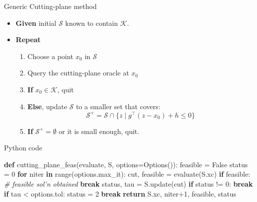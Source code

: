 \documentclass[10pt,ignorenonframetext,serif,onlymath]{beamer}
\newenvironment{Shaded}{}{}
\newcommand{\BuiltInTok}[1]{#1}
\newcommand{\CommentTok}[1]{\textcolor[rgb]{0.38,0.63,0.69}{\textit{#1}}}
\newcommand{\ControlFlowTok}[1]{\textcolor[rgb]{0.00,0.44,0.13}{\textbf{#1}}}
\newcommand{\DecValTok}[1]{\textcolor[rgb]{0.25,0.63,0.44}{#1}}
\newcommand{\KeywordTok}[1]{\textcolor[rgb]{0.00,0.44,0.13}{\textbf{#1}}}
\newcommand{\NormalTok}[1]{#1}
\newcommand{\OperatorTok}[1]{\textcolor[rgb]{0.40,0.40,0.40}{#1}}
\newcommand{\VariableTok}[1]{\textcolor[rgb]{0.10,0.09,0.49}{#1}}
\providecommand{\tightlist}{%
  \setlength{\itemsep}{0pt}\setlength{\parskip}{0pt}}
\begin{document}
\begin{frame}{Generic Cutting-plane method}
\protect\hypertarget{sec:generic-cutting-plane-method}{}

\begin{itemize}
\tightlist
\item
  \textbf{Given} initial \(\mathcal{S}\) known to contain
  \(\mathcal{K}\).
\item
  \textbf{Repeat}

  \begin{enumerate}
  [1.]
  \tightlist
  \item
    Choose a point \(x_0\) in \(\mathcal{S}\)
  \item
    Query the cutting-plane oracle at \(x_0\)
  \item
    \textbf{If} \(x_0 \in \mathcal{K}\), quit
  \item
    \textbf{Else}, update \(\mathcal{S}\) to a smaller set that covers:
    \[\mathcal{S}^+ = \mathcal{S} \cap \{z \mid g^\top (z - x_0) + h \leq 0\}\]
  \item
    \textbf{If} \(\mathcal{S}^+ = \emptyset\) or it is small enough,
    quit.
  \end{enumerate}
\end{itemize}

\end{frame}

\begin{frame}[fragile]{Python code}
\protect\hypertarget{sec:python-code}{}

\begin{Shaded}
\begin{Highlighting}[]
\KeywordTok{def}\NormalTok{ cutting_plane_feas(evaluate, S, options}\OperatorTok{=}\NormalTok{Options()):}
\NormalTok{    feasible }\OperatorTok{=} \VariableTok{False}
\NormalTok{    status }\OperatorTok{=} \DecValTok{0}
    \ControlFlowTok{for}\NormalTok{ niter }\KeywordTok{in} \BuiltInTok{range}\NormalTok{(options.max_it):}
\NormalTok{        cut, feasible }\OperatorTok{=}\NormalTok{ evaluate(S.xc)}
        \ControlFlowTok{if}\NormalTok{ feasible:  }\CommentTok{# feasible sol'n obtained}
            \ControlFlowTok{break}
\NormalTok{        status, tau }\OperatorTok{=}\NormalTok{ S.update(cut)}
        \ControlFlowTok{if}\NormalTok{ status }\OperatorTok{!=} \DecValTok{0}\NormalTok{:}
            \ControlFlowTok{break}
        \ControlFlowTok{if}\NormalTok{ tau }\OperatorTok{<}\NormalTok{ options.tol:}
\NormalTok{            status }\OperatorTok{=} \DecValTok{2}
            \ControlFlowTok{break}
    \ControlFlowTok{return}\NormalTok{ S.xc, niter}\OperatorTok{+}\DecValTok{1}\NormalTok{, feasible, status}
\end{Highlighting}
\end{Shaded}

\end{frame}
\end{document}
